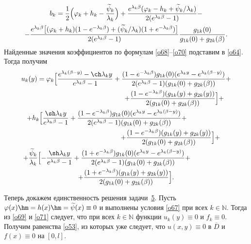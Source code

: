 \begin{multline}
b_k=\frac{1}{2}\Bigl(\varphi_k+h_k-\frac{\widetilde{\psi}_k}{\lambda_k}\Bigr)+ \frac{e^{\lambda_k\beta}
(\varphi_k-h_k+\widetilde{\psi}_k/\lambda_k )} {2(e^{\lambda_k\beta}-1)}-
\\
\label{o70}
-\frac{e^{\lambda_k\beta}\bigl[(\varphi_k+h_k)(1-e^{-\lambda_k\beta})+ (\widetilde{\psi}_k/\lambda_k)(1+e^{-\lambda_k\beta})\bigr]} {2(e^{\lambda_k\beta}-1)} \frac{g_{1k}(0)}{g_{1k}(0)+g_{2k}(\beta)}.
\end{multline}
Найденные значения коэффициентов по формулам \eqref{o68}--\eqref{o70} подставим в \eqref{o64}. 
Тогда получим
\begin{multline}
u_k(y)=
\varphi_k
\Bigl[\frac{e^{\lambda_k(\beta-y)}-\ch\lambda_ky}{e^{\lambda_k\beta}-1}+ \frac{(1-e^{-\lambda_k\beta})g_{1k}(0)(e^{\lambda_ky}-e^{\lambda_k(\beta-y)})} {2(e^{\lambda_k\beta}-1)(g_{1k}(0)+g_{2k}(\beta))}+
\\
\hspace{5cm}
+\frac{(1-e^{-\lambda_k\beta})(g_{1k}(y)+g_{2k}(y))} {2(g_{1k}(0)+g_{2k}(\beta))}\Bigr]+
\\
+ h_k\Bigl[\frac{\sh\lambda_ky}{e^{\lambda_k\beta}-1}+\frac{(1-e^{-\lambda_k\beta})g_{1k}(0)(e^{\lambda_ky}-e^{\lambda_k(\beta-y)})} {2(e^{\lambda_k\beta}-1)(g_{1k}(0)+g_{2k}(\beta))}+  \hspace{2cm}
\\
\hspace{4.6cm}
+\frac{(1-e^{-\lambda_k\beta})(g_{1k}(y)+g_{2k}(y))} {2(g_{1k}(0)+g_{2k}(\beta))}\Bigr]+ 
\\
+ \frac{\widetilde{\psi}_k}{\lambda_k}\Bigl[-\frac{\sh\lambda_ky}{e^{\lambda_k\beta}-1}+ 
\label{o71}
\frac{(1+e^{-\lambda_k\beta})g_{1k}(0)(e^{\lambda_ky}-e^{\lambda_k(\beta-y)})} {2(e^{\lambda_k\beta}-1)(g_{1k}(0)+g_{2k}(\beta))}+
 \hspace{2cm}
 \\
+
\frac{(1+e^{-\lambda_k\beta})(g_{1k}(y)+g_{2k}(y))} {2(g_{1k}(0)+g_{2k}(\beta))}\Bigr].
\end{multline}

Теперь докажем единственность решения задачи~\hyperlink{sab:task5}{5}. 
Пусть $\varphi(x)\hm=h(x)\hm=\widetilde{\psi}(x)\equiv0$ и выполнены условия \eqref{o67} при всех $k\in\mathbb{N}$. Тогда из \eqref{o69} и \eqref{o71} следует, что при всех $k\in\mathbb{N}$ функции $u_k(y)\equiv0$ и $f_k\equiv0$. Получим равенства \eqref{o53}, из которых уже следует, что $u(x,y)\equiv0$ в $\overline{D}$ и  $f(x)\equiv0$ на $[0,l]$.

